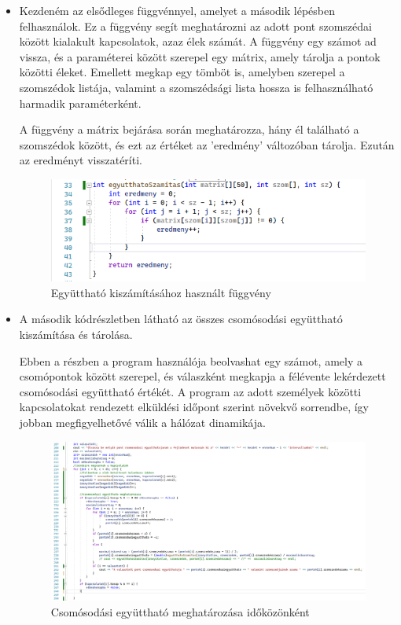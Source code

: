 \begin{itemize}
    \item Kezdeném az elsődleges függvénnyel, amelyet a második lépésben felhasználok. Ez a függvény segít meghatározni az adott pont szomszédai között kialakult kapcsolatok, azaz élek számát. A függvény egy számot ad vissza, és a paraméterei között szerepel egy mátrix, amely tárolja a pontok közötti éleket. Emellett megkap egy tömböt is, amelyben szerepel a szomszédok listája, valamint a szomszédsági lista hossza is felhasználható harmadik paraméterként.

A függvény a mátrix bejárása során meghatározza, hány él található a szomszédok között, és ezt az értéket az 'eredmény' változóban tárolja. Ezután az eredményt visszatéríti.
    \begin{figure}[h]
    \centering
    \includegraphics[scale=1 ]{images/egyutthatoszamitas}
    \caption{Együttható kiszámításához használt függvény}
    \end{figure}
    
    \item A második kódrészletben látható az összes csomósodási együttható kiszámítása és tárolása.

Ebben a részben a program használója beolvashat egy számot, amely a csomópontok között szerepel, és válaszként megkapja a félévente lekérdezett csomósodási együttható értékét. A program az adott személyek közötti kapcsolatokat rendezett elküldési időpont szerint növekvő sorrendbe, így jobban megfigyelhetővé válik a hálózat dinamikája.

    
    \begin{figure}[h]
    \centering
    \includegraphics[scale=0.5 ]{images/egyutthato}
    \caption{Csomósodási együttható meghatározása időközönként}
    \label{fig:enter-label}
    \end{figure}


\end{itemize}

